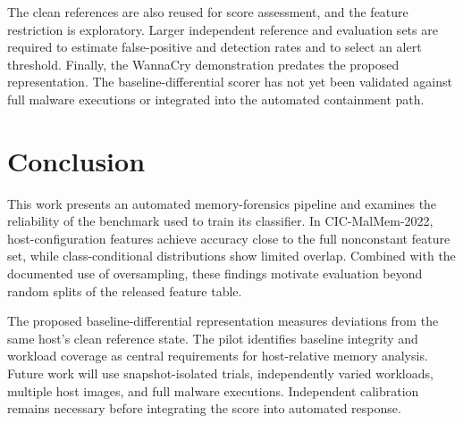 \documentclass[conference]{IEEEtran}
\begin{document}
The clean references are also reused for score assessment, and the feature
restriction is exploratory. Larger independent reference and evaluation sets
are required to estimate false-positive and detection rates and to select an
alert threshold. Finally, the WannaCry demonstration predates the proposed
representation. The baseline-differential scorer has not yet been validated
against full malware executions or integrated into the automated containment
path.

\section{Conclusion}

This work presents an automated memory-forensics pipeline and examines the
reliability of the benchmark used to train its classifier. In CIC-MalMem-2022,
host-configuration features achieve accuracy close to the full nonconstant
feature set, while class-conditional distributions show limited overlap.
Combined with the documented use of oversampling, these findings motivate
evaluation beyond random splits of the released feature table.

The proposed baseline-differential representation measures deviations from
the same host's clean reference state. The pilot identifies baseline integrity
and workload coverage as central requirements for host-relative memory analysis.
Future work will use snapshot-isolated trials, independently varied workloads,
multiple host images, and full malware executions. Independent calibration
remains necessary before integrating the score into automated response.
\end{document}
